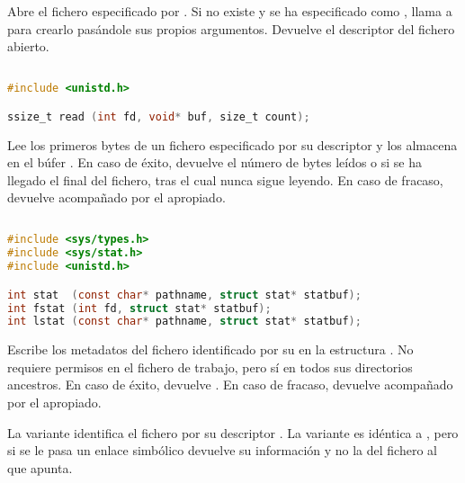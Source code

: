 Abre el fichero especificado por .
Si no existe y se ha especificado  como , llama a  para crearlo pasándole sus propios argumentos.
Devuelve el descriptor del fichero abierto.

\subsection{}\label{read}

\begin{lstlisting}[language=C]
#include <unistd.h>

ssize_t read (int fd, void* buf, size_t count);
\end{lstlisting}

Lee los  primeros bytes de un fichero especificado por su descriptor  y los almacena en el búfer .
En caso de éxito, devuelve el número de bytes leídos o  si se ha llegado el final del fichero, tras el cual nunca sigue leyendo.
En caso de fracaso, devuelve  acompañado por el  apropiado.

\subsection{}\label{stat}

\begin{lstlisting}[language=C]
#include <sys/types.h>
#include <sys/stat.h>
#include <unistd.h>

int stat  (const char* pathname, struct stat* statbuf);
int fstat (int fd, struct stat* statbuf);
int lstat (const char* pathname, struct stat* statbuf);
\end{lstlisting}

Escribe los metadatos del fichero identificado por su  en la estructura .
No requiere permisos en el fichero de trabajo, pero sí en todos sus directorios ancestros.
En caso de éxito, devuelve .
En caso de fracaso, devuelve  acompañado por el  apropiado.

La variante  identifica el fichero por su descriptor .
La variante  es idéntica a , pero si se le pasa un enlace simbólico devuelve su información y no la del fichero al que apunta.

\subsection{}\label{umask}

